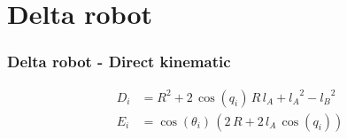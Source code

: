 %
\section[Delta robot]{Delta robot}
%
\begin{frame}
	\frametitle{Delta robot - Direct kinematic}
	\begin{align}
		D_i &= R^2+2\,\cos\left(q_{i}\right)\,R\,l_{A}+{l_{A}}^2-{l_{B}}^2\\
		E_i &= \cos\left(\theta _{i}\right)\,\left(2\,R+2\,l_{A}\,\cos\left(q_{i}\right)\right)
	\end{align}
\end{frame}
